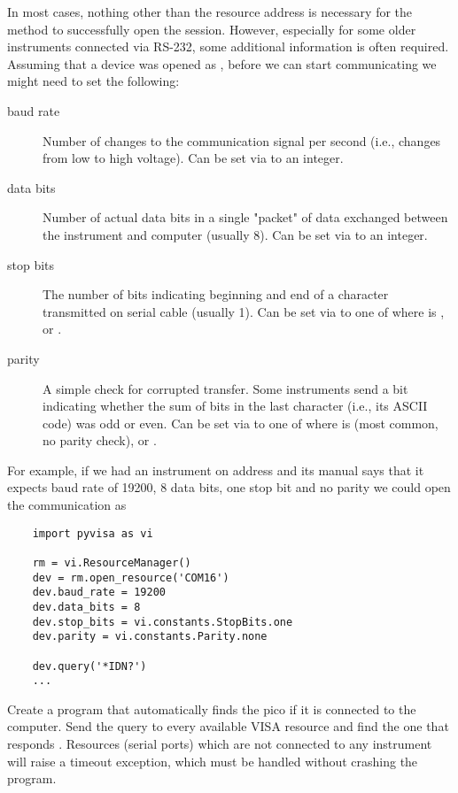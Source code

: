 In most cases, nothing other than the resource address is necessary for the  method to successfully open the session. However, especially for some older instruments connected via RS-232, some additional information is often required. Assuming that a device was opened as , before we can start communicating we might need to set the following:
\begin{description}
    \item[baud rate] Number of changes to the communication signal per second (i.e., changes from low to high voltage). Can be set via  to an integer.
    \item[data bits] Number of actual data bits in a single "packet" of data exchanged between the instrument and computer (usually 8). Can be set via  to an integer.
    \item[stop bits] The number of bits indicating beginning and end of a character transmitted on serial cable (usually 1). Can be set via  to one of  where  is ,  or .
    \item[parity] A simple check for corrupted transfer. Some instruments send a bit indicating whether the sum of bits in the last character (i.e., its ASCII code) was odd or even. Can be set via  to one of  where  is  (most common, no parity check),  or .
\end{description}
For example, if we had an instrument on address  and its manual says that it expects baud rate of 19200, 8 data bits, one stop bit and no parity we could open the communication as
\begin{lstlisting}
    import pyvisa as vi

    rm = vi.ResourceManager()
    dev = rm.open_resource('COM16')
    dev.baud_rate = 19200
    dev.data_bits = 8
    dev.stop_bits = vi.constants.StopBits.one
    dev.parity = vi.constants.Parity.none

    dev.query('*IDN?')
    ...
\end{lstlisting}

\begin{exercise}
    Create a program that automatically finds the pico if it is connected to the computer. Send the  query to every available VISA resource and find the one that responds . Resources (serial ports) which are not connected to any instrument will raise a timeout exception, which must be handled without crashing the program.
\end{exercise}

